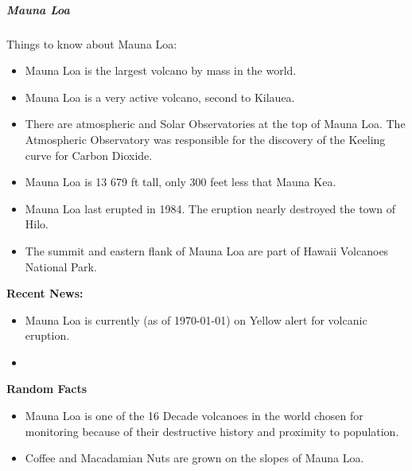 \documentclass[12pt]{book}
\begin{document}
					\newpage
					\subparagraph{Mauna Loa}
						Things to know about Mauna Loa:
						\begin{itemize}
							\item Mauna Loa is the largest volcano by mass in the world.  
							\item Mauna Loa is a very active volcano, second to Kilauea.
							\item There are atmospheric and Solar Observatories at the top of Mauna Loa.  The Atmospheric Observatory was responsible for the discovery of the Keeling curve for Carbon Dioxide.
							\item Mauna Loa is 13 679 ft tall, only 300 feet less that Mauna Kea.
							\item Mauna Loa last erupted in 1984.  The eruption nearly destroyed the town of Hilo.
							\item The summit and eastern flank of Mauna Loa are part of Hawaii Volcanoes National Park.  
						\end{itemize}
						
						\textbf{Recent News:} 
						\begin{itemize}
							\item Mauna Loa is currently (as of \today) on Yellow alert for volcanic eruption.
							\item 
						\end{itemize}
						
						\textbf{Random Facts}
						\begin{itemize}
							\item Mauna Loa is one of the 16 Decade volcanoes in the world chosen for monitoring because of their destructive history and proximity to population. 
							\item Coffee and Macadamian Nuts are grown on the slopes of Mauna Loa.
							
						\end{itemize}					
					
\end{document}
